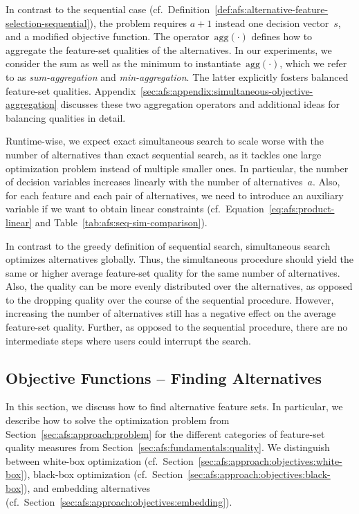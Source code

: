 \documentclass{article}
\theoremstyle{definition}
\begin{document}
%
In contrast to the sequential case (cf.~Definition~\ref{def:afs:alternative-feature-selection-sequential}), the problem requires $a+1$ instead one decision vector~$s$, and a modified objective function.
The operator~$\text{agg}(\cdot)$ defines how to aggregate the feature-set qualities of the alternatives.
In our experiments, we consider the sum as well as the minimum to instantiate~$\text{agg}(\cdot)$, which we refer to as \emph{sum-aggregation} and \emph{min-aggregation}.
The latter explicitly fosters balanced feature-set qualities.
Appendix~\ref{sec:afs:appendix:simultaneous-objective-aggregation} discusses these two aggregation operators and additional ideas for balancing qualities in detail.

Runtime-wise, we expect exact simultaneous search to scale worse with the number of alternatives than exact sequential search, as it tackles one large optimization problem instead of multiple smaller ones.
In particular, the number of decision variables increases linearly with the number of alternatives~$a$.
Also, for each feature and each pair of alternatives, we need to introduce an auxiliary variable if we want to obtain linear constraints (cf.~Equation~\ref{eq:afs:product-linear} and Table~\ref{tab:afs:seq-sim-comparison}).

In contrast to the greedy definition of sequential search, simultaneous search optimizes alternatives globally.
Thus, the simultaneous procedure should yield the same or higher average feature-set quality for the same number of alternatives.
Also, the quality can be more evenly distributed over the alternatives, as opposed to the dropping quality over the course of the sequential procedure.
However, increasing the number of alternatives still has a negative effect on the average feature-set quality.
Further, as opposed to the sequential procedure, there are no intermediate steps where users could interrupt the search.

\subsection{Objective Functions -- Finding Alternatives}
\label{sec:afs:approach:objectives}

In this section, we discuss how to find alternative feature sets.
In particular, we describe how to solve the optimization problem from Section~\ref{sec:afs:approach:problem} for the different categories of feature-set quality measures from Section~\ref{sec:afs:fundamentals:quality}.
We distinguish between white-box optimization (cf.~Section~\ref{sec:afs:approach:objectives:white-box}), black-box optimization (cf.~Section~\ref{sec:afs:approach:objectives:black-box}), and embedding alternatives (cf.~Section~\ref{sec:afs:approach:objectives:embedding}).
\end{document}
